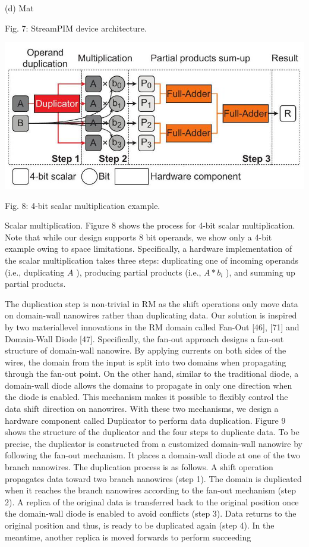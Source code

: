 \documentclass[10pt]{article}
\begin{document}
(d) Mat

Fig. 7: StreamPIM device architecture.

\begin{center}
\includegraphics[max width=\textwidth]{2024_05_12_abeba8a85da5b5ec4c7bg-05(3)}
\end{center}

Fig. 8: 4-bit scalar multiplication example.

Scalar multiplication. Figure 8 shows the process for 4-bit scalar multiplication. Note that while our design supports 8 bit operands, we show only a 4-bit example owing to space limitations. Specifically, a hardware implementation of the scalar multiplication takes three steps: duplicating one of incoming operands (i.e., duplicating $A$ ), producing partial products (i.e., $A * b_{i}$ ), and summing up partial products.

The duplication step is non-trivial in RM as the shift operations only move data on domain-wall nanowires rather than duplicating data. Our solution is inspired by two materiallevel innovations in the RM domain called Fan-Out [46], [71] and Domain-Wall Diode [47]. Specifically, the fan-out approach designs a fan-out structure of domain-wall nanowire. By applying currents on both sides of the wires, the domain from the input is split into two domains when propagating through the fan-out point. On the other hand, similar to the traditional diode, a domain-wall diode allows the domains to propagate in only one direction when the diode is enabled. This mechanism makes it possible to flexibly control the data shift direction on nanowires. With these two mechanisms, we design a hardware component called Duplicator to perform data duplication. Figure 9 shows the structure of the duplicator and the four steps to duplicate data. To be precise, the duplicator is constructed from a customized domain-wall nanowire by following the fan-out mechanism. It places a domain-wall diode at one of the two branch nanowires. The duplication process is as follows. A shift operation propagates data toward two branch nanowires (step 1). The domain is duplicated when it reaches the branch nanowires according to the fan-out mechanism (step 2). A replica of the original data is transferred back to the original position once the domain-wall diode is enabled to avoid conflicts (step 3). Data returns to the original position and thus, is ready to be duplicated again (step 4). In the meantime, another replica is moved forwards to perform succeeding
\end{document}
